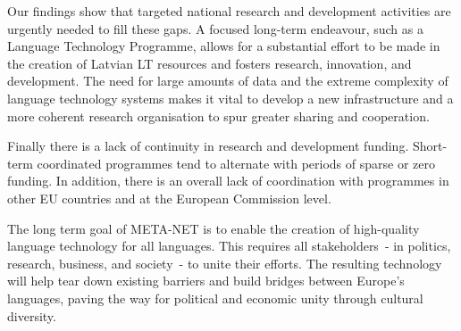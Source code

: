 \begin{multicols}{2}
Our findings show that targeted national research and development activities are urgently needed to fill these gaps.
A focused long-term endeavour, such as a Language Technology Programme, allows for a substantial effort to be made in the creation of Latvian LT resources and fosters research, innovation, and development.
The need for large amounts of data and the extreme complexity of language technology systems makes it vital to develop a new infrastructure and a more coherent research organisation to spur greater sharing and cooperation.

Finally there is a lack of continuity in research and development funding.
Short-term coordinated programmes tend to alternate with periods of sparse or zero funding.
In addition, there is an overall lack of coordination with programmes in other EU countries and at the European Commission level.

The long term goal of META-NET is to enable the creation of high-quality language technology for all languages.
This requires all stakeholders~- in politics, research, business, and society~- to unite their efforts.
The resulting technology will help tear down existing barriers and build bridges between Europe's languages, paving the way for political and economic unity through cultural diversity.

\end{multicols}
\clearpage

